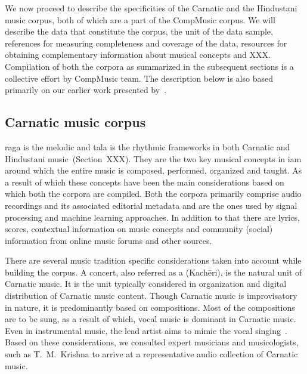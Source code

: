 We now proceed to describe the specificities of the Carnatic and the Hindustani music corpus, both of which are a part of the CompMusic corpus. We will describe the data that constitute the corpus, the unit of the data sample, references for measuring completeness and coverage of the data, resources for obtaining complementary information about musical concepts and XXX. Compilation of both the corpora as summarized in the subsequent sections is a collective effort by CompMusic team. The description below is also based primarily on our earlier work presented by~\cite{CM_Corpora_Ajay14}.


\subsection{Carnatic music corpus}
\label{sec:corpus_carnatic_music_corpus}

\Gls{raga} is the melodic and \gls{tala} is the rhythmic frameworks in both Carnatic and Hindustani music~(Section~XXX). They are the two key musical concepts in \gls{iam} around which the entire music is composed, performed, organized and taught. As a result of which these concepts have been the main considerations based on which both the corpora are compiled. Both the corpora primarily comprise audio recordings and its associated editorial metadata and are the ones used by signal processing and machine learning approaches. In addition to that there are lyrics, scores, contextual information on music concepts and community (social) information from online music forums and other sources.

There are several music tradition specific considerations taken into account while building the corpus. A concert, also referred as a (Kach\={e}ri), is the natural unit of Carnatic music. It is the unit typically considered in organization and digital distribution of Carnatic music content. Though Carnatic music is improvisatory in nature, it is predominantly based on compositions. Most of the compositions are to be sung, as a result of which, vocal music is dominant in Carnatic music. Even in instrumental music, the lead artist aims to mimic the vocal singing~\citep{Viswanathan2004}. Based on these considerations, we consulted expert musicians and musicologists, such as T.~M.~Krishna to arrive at a representative audio collection of Carnatic music.

